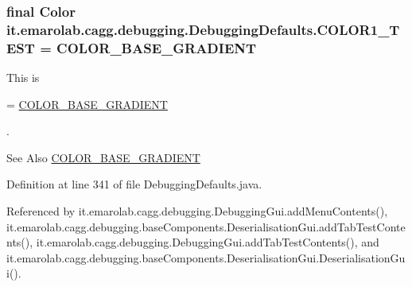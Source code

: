 \hypertarget{classit_1_1emarolab_1_1cagg_1_1debugging_1_1DebuggingDefaults_a6dbcece18ae2f50b0acf05993eadc992}{
\subsubsection[{C\-O\-L\-O\-R1\-\_\-\-T\-E\-S\-T}]{\setlength{\rightskip}{0pt plus 5cm}final Color it.\-emarolab.\-cagg.\-debugging.\-Debugging\-Defaults.\-C\-O\-L\-O\-R1\-\_\-\-T\-E\-S\-T = {\bf C\-O\-L\-O\-R\-\_\-\-B\-A\-S\-E\-\_\-\-G\-R\-A\-D\-I\-E\-N\-T}\hspace{0.3cm}{\ttfamily [static]}}}\label{classit_1_1emarolab_1_1cagg_1_1debugging_1_1DebuggingDefaults_a6dbcece18ae2f50b0acf05993eadc992}
This is
\begin{DoxyCode}
= \hyperlink{classit_1_1emarolab_1_1cagg_1_1debugging_1_1DebuggingDefaults_a17491ab8ed655381e8f8cc34e9d3b670}{COLOR\_BASE\_GRADIENT} 
\end{DoxyCode}
 . \begin{DoxySeeAlso}{See Also}
\hyperlink{classit_1_1emarolab_1_1cagg_1_1debugging_1_1DebuggingDefaults_a17491ab8ed655381e8f8cc34e9d3b670}{C\-O\-L\-O\-R\-\_\-\-B\-A\-S\-E\-\_\-\-G\-R\-A\-D\-I\-E\-N\-T} 
\end{DoxySeeAlso}


Definition at line 341 of file Debugging\-Defaults.\-java.



Referenced by it.\-emarolab.\-cagg.\-debugging.\-Debugging\-Gui.\-add\-Menu\-Contents(), it.\-emarolab.\-cagg.\-debugging.\-base\-Components.\-Deserialisation\-Gui.\-add\-Tab\-Test\-Contents(), it.\-emarolab.\-cagg.\-debugging.\-Debugging\-Gui.\-add\-Tab\-Test\-Contents(), and it.\-emarolab.\-cagg.\-debugging.\-base\-Components.\-Deserialisation\-Gui.\-Deserialisation\-Gui().

